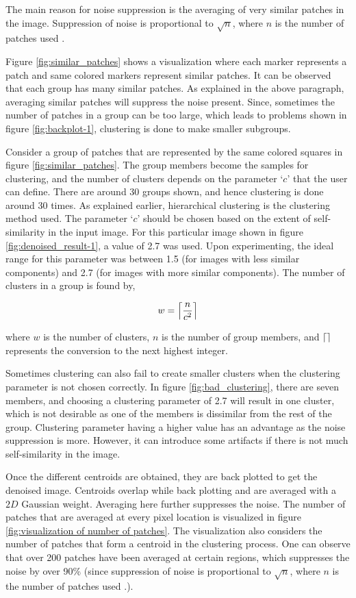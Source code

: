 \documentclass[fleqn,10pt]{wlscirep}
\DeclarePairedDelimiter\ceil{\lceil}{\rceil}
\begin{document}
The main reason for noise suppression is the averaging of very similar patches in the image. Suppression of noise is proportional to $\sqrt{n}$, where $n$ is the number of patches used \cite{bcm_nlm}.

Figure \ref{fig:similar_patches} shows a visualization where each marker represents a patch and same colored markers represent similar patches. It can be observed that each group has many similar patches. As explained in the above paragraph, averaging similar patches will suppress the noise present. Since, sometimes the number of patches in a group can be too large, which leads to problems shown in figure \ref{fig:backplot-1}, clustering is done to make smaller subgroups.

Consider a group of patches that are represented by the same colored squares in figure \ref{fig:similar_patches}. The group members become the samples for clustering, and the number of clusters depends on the parameter `$c$’ that the user can define. There are around 30 groups shown, and hence clustering is done around 30 times. As explained earlier, hierarchical clustering is the clustering method used. The parameter `$c$’ should be chosen based on the extent of self-similarity in the input image. For this particular image shown in figure \ref{fig:denoised_result-1}, a value of 2.7 was used. Upon experimenting, the ideal range for this parameter was between 1.5 (for images with less similar components) and 2.7 (for images with more similar components). The number of clusters in a group is found by,

\begin{equation}
	w = \ceil*{\frac{n}{c^{2}}}
	\label{eq:clustering}
\end{equation}

where $w$ is the number of clusters, $n$ is the number of group members, and $\ceil{}$ represents the conversion to the next highest integer.

Sometimes clustering can also fail to create smaller clusters when the clustering parameter is not chosen correctly. In figure \ref{fig:bad_clustering}, there are seven members, and choosing a clustering parameter of 2.7 will result in one cluster, which is not desirable as one of the members is dissimilar from the rest of the group. Clustering parameter having a higher value has an advantage as the noise suppression is more. However, it can introduce some artifacts if there is not much self-similarity in the image. 

Once the different centroids are obtained, they are back plotted to get the denoised image. Centroids overlap while back plotting and are averaged with a $2D$ Gaussian weight. Averaging here further suppresses the noise. The number of patches that are averaged at every pixel location is visualized in figure \ref{fig:visualization of number of patches}. The visualization also considers the number of patches that form a centroid in the clustering process. One can observe that over 200 patches have been averaged at certain regions, which suppresses the noise by over 90\%  (since suppression of noise is proportional to $\sqrt{n}$, where $n$ is the number of patches used \cite{bcm_nlm}.).
\end{document}

